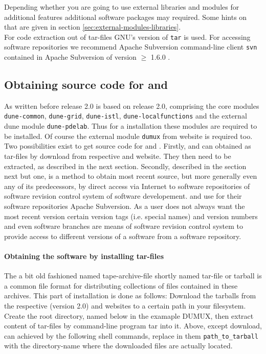 Depending whether you are going to use external libraries and modules for additional \Dune features 
additional software packages  may required. Some hints on that are given in section \ref{sec:external-modules-libraries}.\\

For code extraction out of tar-files GNU's version of \texttt{tar} is used.
For accessing software repositories we recommend Apache Subversion command-line client \texttt{svn}
contained in Apache Subversion of version $\geqslant$ 1.6.0 \cite{APACHE-SUBVERSION-HP}. 

\subsection{Obtaining source code for \Dune and \Dumux}
As written before \Dumux release 2.0 is based on \Dune release 2.0, comprising the core modules 
\texttt{dune-common}, \texttt{dune-grid}, \texttt{dune-istl}, \texttt{dune-localfunctions} and the external dune
module \texttt{dune-pdelab}. Thus for a \Dumux installation these modules are required to be installed.
Of course the external \Dune module \texttt{dumux} from \Dumux website is required too.\\

Two possibilities exist to get source code for \Dune and \Dumux.
Firstly, \Dune and \Dumux can obtained as tar-files by download from respective {\Dune} and {\Dumux} website. They then need to be extracted, as described in the next section.
Secondly, described in the section next but one, is a method to obtain most recent source, but more generally even any of its predecessors, by direct access via Internet to software repositories of software revision control system of software developement. \Dune and \Dumux use for their software repositories Apache Subversion.
As a user does not always want the most recent version
certain version tags (i.e. special names) and version numbers and even software branches are means of software revision control system to provide access to different versions of a software from a software repository.

\paragraph{Obtaining the software by installing tar-files}
The a bit old fashioned named tape-archive-file shortly named tar-file or tarball is a common file format for distributing collections of files contained in these archives.
This part of installation is done as follows: 
Download the tarballs from the respective \Dune (version 2.0) and \Dumux websites to a certain path in your filesystem.
Create the {\Dune} root directory, named below in the examaple DUMUX, then extract content of tar-files by command-line program tar into it.
Above, except download, can achieved by the following shell commands, replace in them \texttt{path\_to\_tarball} with the directory-name where the downloaded files are actually located.

